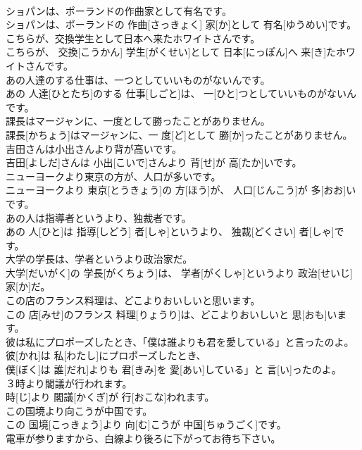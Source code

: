\documentclass[8pt]{extreport}
\begin{document}
\begin{CJK}{UTF8}{min}
\\	ショパンは、ポーランドの作曲家として有名です。	
\\	ショパンは、ポーランドの 作曲[さっきょく] 家[か]として 有名[ゆうめい]です。	
\\	こちらが、交換学生として日本へ来たホワイトさんです。	
\\	こちらが、 交換[こうかん] 学生[がくせい]として 日本[にっぽん]へ 来[き]たホワイトさんです。	
\\	あの人達のする仕事は、一つとしていいものがないんです。	
\\	あの 人達[ひとたち]のする 仕事[しごと]は、 一[ひと]つとしていいものがないんです。	
\\	課長はマージャンに、一度として勝ったことがありません。	
\\	課長[かちょう]はマージャンに、一 度[ど]として 勝[か]ったことがありません。	
\\	吉田さんは小出さんより背が高いです。	
\\	吉田[よしだ]さんは 小出[こいで]さんより 背[せ]が 高[たか]いです。	
\\	ニューヨークより東京の方が、人口が多いです。	
\\	ニューヨークより 東京[とうきょう]の 方[ほう]が、 人口[じんこう]が 多[おお]いです。	
\\	あの人は指導者というより、独裁者です。	
\\	あの 人[ひと]は 指導[しどう] 者[しゃ]というより、 独裁[どくさい] 者[しゃ]です。	
\\	大学の学長は、学者というより政治家だ。	
\\	大学[だいがく]の 学長[がくちょう]は、 学者[がくしゃ]というより 政治[せいじ] 家[か]だ。	
\\	この店のフランス料理は、どこよりおいしいと思います。	
\\	この 店[みせ]のフランス 料理[りょうり]は、どこよりおいしいと 思[おも]います。	
\\	彼は私にプロポーズしたとき、「僕は誰よりも君を愛している」と言ったのよ。	
\\	彼[かれ]は 私[わたし]にプロポーズしたとき、
\\	僕[ぼく]は 誰[だれ]よりも 君[きみ]を 愛[あい]している」と 言[い]ったのよ。	
\\	３時より閣議が行われます。	
\\	時[じ]より 閣議[かくぎ]が 行[おこな]われます。	
\\	この国境より向こうが中国です。	
\\	この 国境[こっきょう]より 向[む]こうが 中国[ちゅうごく]です。	
\\	電車が参りますから、白線より後ろに下がってお待ち下さい。	

\end{CJK}
\end{document}

